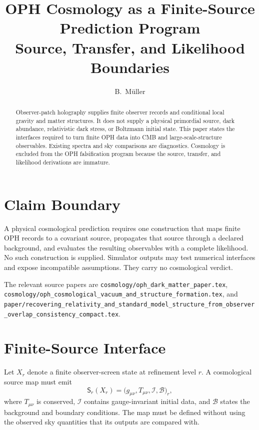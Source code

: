 \documentclass[11pt]{article}
\title{OPH Cosmology as a Finite-Source Prediction Program\\
\large Source, Transfer, and Likelihood Boundaries}
\author{B.\ M\"uller}
\date{\OPHPaperReleaseDate}
\newcommand{\pathref}[1]{\nolinkurl{#1}}
\begin{document}
\maketitle
\OPHPaperReleaseBanner

\begin{abstract}
Observer-patch holography supplies finite observer records and conditional
local gravity and matter structures. It does not supply a physical primordial
source, dark abundance, relativistic dark stress, or Boltzmann initial state.
This paper states the interfaces required to turn finite OPH data into CMB and
large-scale-structure observables. Existing spectra and sky comparisons are
diagnostics. Cosmology is excluded from the OPH falsification program because
the source, transfer, and likelihood derivations are immature.
\end{abstract}

\section{Claim Boundary}

A physical cosmological prediction requires one construction that maps finite
OPH records to a covariant source, propagates that source through a declared
background, and evaluates the resulting observables with a complete likelihood.
No such construction is supplied. Simulator outputs may test numerical
interfaces and expose incompatible assumptions. They carry no cosmological
verdict.

The relevant source papers are
\pathref{cosmology/oph_dark_matter_paper.tex},
\pathref{cosmology/oph_cosmological_vacuum_and_structure_formation.tex}, and
\pathref{paper/recovering_relativity_and_standard_model_structure_from_observer_overlap_consistency_compact.tex}.

\section{Finite-Source Interface}

Let \(X_r\) denote a finite observer-screen state at refinement level \(r\).
A cosmological source map must emit
\begin{equation}
\mathsf S_r(X_r)
=\bigl(g_{\mu\nu},T_{\mu\nu},\mathcal I,\mathcal B\bigr)_r,
\label{eq:source-map}
\end{equation}
where \(T_{\mu\nu}\) is conserved, \(\mathcal I\) contains gauge-invariant
initial data, and \(\mathcal B\) states the background and boundary conditions.
The map must be defined without using the observed sky quantities that its
outputs are compared with.
\end{document}
